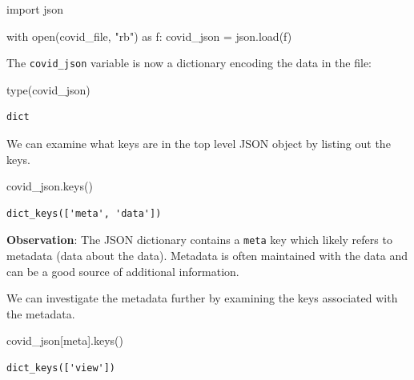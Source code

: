 \documentclass[
  letterpaper,
  DIV=11,
  numbers=noendperiod]{scrreprt}
\newenvironment{Shaded}{\begin{snugshade}}{\end{snugshade}}
\newcommand{\BuiltInTok}[1]{\textcolor[rgb]{0.00,0.23,0.31}{#1}}
\newcommand{\ControlFlowTok}[1]{\textcolor[rgb]{0.00,0.23,0.31}{#1}}
\newcommand{\ImportTok}[1]{\textcolor[rgb]{0.00,0.46,0.62}{#1}}
\newcommand{\NormalTok}[1]{\textcolor[rgb]{0.00,0.23,0.31}{#1}}
\newcommand{\OperatorTok}[1]{\textcolor[rgb]{0.37,0.37,0.37}{#1}}
\newcommand{\StringTok}[1]{\textcolor[rgb]{0.13,0.47,0.30}{#1}}
\begin{document}
\begin{Shaded}
\begin{Highlighting}[]
\ImportTok{import}\NormalTok{ json}

\ControlFlowTok{with} \BuiltInTok{open}\NormalTok{(covid\_file, }\StringTok{"rb"}\NormalTok{) }\ImportTok{as}\NormalTok{ f:}
\NormalTok{    covid\_json }\OperatorTok{=}\NormalTok{ json.load(f)}
\end{Highlighting}
\end{Shaded}

The \texttt{covid\_json} variable is now a dictionary encoding the data
in the file:

\begin{Shaded}
\begin{Highlighting}[]
\BuiltInTok{type}\NormalTok{(covid\_json)}
\end{Highlighting}
\end{Shaded}

\begin{verbatim}
dict
\end{verbatim}

We can examine what keys are in the top level JSON object by listing out
the keys.

\begin{Shaded}
\begin{Highlighting}[]
\NormalTok{covid\_json.keys()}
\end{Highlighting}
\end{Shaded}

\begin{verbatim}
dict_keys(['meta', 'data'])
\end{verbatim}

\textbf{Observation}: The JSON dictionary contains a \texttt{meta} key
which likely refers to metadata (data about the data). Metadata is often
maintained with the data and can be a good source of additional
information.

We can investigate the metadata further by examining the keys associated
with the metadata.

\begin{Shaded}
\begin{Highlighting}[]
\NormalTok{covid\_json[}\StringTok{\textquotesingle{}meta\textquotesingle{}}\NormalTok{].keys()}
\end{Highlighting}
\end{Shaded}

\begin{verbatim}
dict_keys(['view'])
\end{verbatim}
\end{document}
